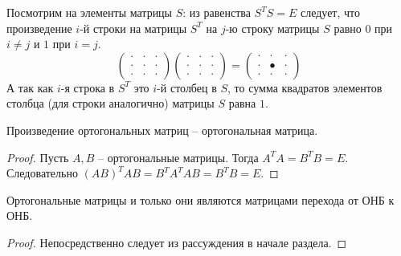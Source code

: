 Посмотрим на элементы матрицы $S$: из равенства $S^TS=E$ следует, что произведение $i$-й строки на матрицы $S^T$ на $j$-ю строку матрицы $S$ равно $0$ при $i\neq j$ и $1$ при $i=j$.
\[
\left(
\begin{array}{ccc}
\cdot & \cdot & \cdot \\
\hline
\cdot & \cdot & \cdot \\
\hline
\cdot & \cdot & \cdot
\end{array}
\right)
\left(
\begin{array}{c|c|c}
\cdot & \cdot & \cdot \\
\cdot & \cdot & \cdot \\
\cdot & \cdot & \cdot
\end{array}
\right)
=
\left(
\begin{array}{ccc}
\cdot & \cdot & \cdot \\
\cdot & \bullet & \cdot \\
\cdot & \cdot & \cdot
\end{array}
\right)
\]
А так как $i$-я строка в $S^T$ это $i$-й столбец в $S$, то сумма квадратов элементов столбца (для строки аналогично) матрицы $S$ равна $1$.
\begin{proposition}
    Произведение ортогональных матриц -- ортогональная матрица.
\end{proposition}
\begin{proof}
    Пусть $A, B$ -- ортогональные матрицы. Тогда $A^TA=B^TB=E$. Следовательно $(AB)^TAB=B^TA^TAB=B^TB=E$.
\end{proof}
\begin{proposition}
    Ортогональные матрицы и только они являются матрицами перехода от ОНБ к ОНБ.
\end{proposition}
\begin{proof}
    Непосредственно следует из рассуждения в начале раздела.
\end{proof}

